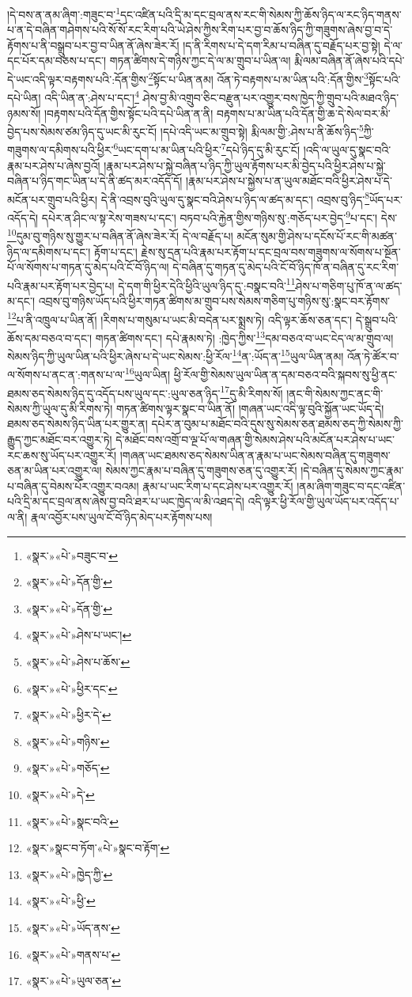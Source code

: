།དེ་བས་ན་ནམ་ཞིག་:གཟུང་བ་\footnote{«སྣར་»«པེ་»བཟུང་བ་}དང་འཛིན་པའི་དྲི་མ་དང་བྲལ་ནས་རང་གི་སེམས་ཀྱི་ཆོས་ཉིད་ལ་རང་ཉིད་གནས་པ་ན་དེ་བཞིན་གཤེགས་པའི་སོ་སོ་རང་རིག་པའི་ཡེ་ཤེས་ཀྱིས་རིག་པར་བྱ་བ་ཆོས་ཉིད་ཀྱི་གཟུགས་ཞེས་བྱ་བ་དེ་རྟོགས་པ་ནི་བསྒྲུབ་པར་བྱ་བ་ཡིན་ནོ་ཞེས་ཟེར་རོ། །ད་ནི་རིགས་པ་དེ་དག་རིམ་པ་བཞིན་དུ་བརྗོད་པར་བྱ་སྟེ། དེ་ལ་དང་པོར་དམ་བཅས་པ་དང་། གཏན་ཚིགས་དེ་གཉིས་ཀྱང་དེ་ལ་མ་གྲུབ་པ་ཡིན་ལ། རྨི་ལམ་བཞིན་ནོ་ཞེས་པའི་དཔེ་དེ་ཡང་འདི་ལྟར་བརྟགས་པའི་:དོན་གྱིས་\footnote{«སྣར་»«པེ་»དོན་གྱི་}སྟོང་པ་ཡིན་ནམ། འོན་ཏེ་བརྟགས་པ་མ་ཡིན་པའི་:དོན་གྱིས་\footnote{«སྣར་»«པེ་»དོན་གྱི་}སྟོང་པའི་དཔེ་ཡིན། འདི་ཡིན་ན་:ཤེས་པ་དང་།\footnote{«སྣར་»«པེ་»ཤེས་པ་ཡང་།} ཤེས་བྱ་མི་འགྲུབ་ཅིང་བརྫུན་པར་འགྱུར་བས་ཁྱེད་ཀྱི་གྲུབ་པའི་མཐའ་ཉིད་ཉམས་སོ། །བརྟགས་པའི་དོན་གྱིས་སྟོང་པའི་དཔེ་ཡིན་ན་ནི། བརྟགས་པ་མ་ཡིན་པའི་དོན་གྱི་ཆ་དེ་སེལ་བར་མི་བྱེད་པས་སེམས་ཙམ་ཉིད་དུ་ཡང་མི་རུང་ངོ། །དཔེ་འདི་ཡང་མ་གྲུབ་སྟེ། རྨི་ལམ་གྱི་:ཤེས་པ་ནི་ཆོས་ཉིད་\footnote{«སྣར་»«པེ་»ཤེས་པ་ཆོས་}ཀྱི་གཟུགས་ལ་དམིགས་པའི་ཕྱིར་\footnote{«སྣར་»«པེ་»ཕྱིར་དང་}ཡང་དག་པ་མ་ཡིན་པའི་ཕྱིར་\footnote{«སྣར་»«པེ་»ཕྱིར་དེ་}དཔེ་ཉིད་དུ་མི་རུང་ངོ། །འདི་ལ་ཡུལ་དུ་སྣང་བའི་རྣམ་པར་ཤེས་པ་ཞེས་བྱའོ། །རྣམ་པར་ཤེས་པ་སྐྱེ་བཞིན་པ་ཉིད་ཀྱི་ཡུལ་རྟོགས་པར་མི་བྱེད་པའི་ཕྱིར་ཤེས་པ་སྐྱེ་བཞིན་པ་ཉིད་གང་ཡིན་པ་དེ་ནི་ཚད་མར་འདོད་དོ། །རྣམ་པར་ཤེས་པ་སྐྱེས་པ་ན་ཡུལ་མཐོང་བའི་ཕྱིར་ཤེས་པ་དེ་མངོན་པར་གྲུབ་པའི་ཕྱིར། དེ་ནི་འབྲས་བུའི་ཡུལ་དུ་སྣང་བའི་ཤེས་པ་ཉིད་ལ་ཚད་མ་དང་། འབྲས་བུ་ཉིད་\footnote{«སྣར་»«པེ་»གཉིས་}ཡོད་པར་འདོད་དེ། དཔེར་ན་ཤིང་ལ་སྟ་རེས་གཟས་པ་དང་། བཏབ་པའི་རྐྱེན་གྱིས་གཉིས་སུ་:གཅོད་པར་བྱེད་\footnote{«སྣར་»«པེ་»གཅོད་}པ་དང་། དེས་\footnote{«སྣར་»«པེ་»དེ་}དུམ་བུ་གཉིས་སུ་གྱུར་པ་བཞིན་ནོ་ཞེས་ཟེར་རོ། དེ་ལ་བརྗོད་པ། མངོན་སུམ་གྱི་ཤེས་པ་དངོས་པོ་རང་གི་མཚན་ཉིད་ལ་དམིགས་པ་དང་། རྟོག་པ་དང་། རྗེས་སུ་དྲན་པའི་རྣམ་པར་རྟོག་པ་དང་བྲལ་བས་གཟུགས་ལ་སོགས་པ་སྔོན་པོ་ལ་སོགས་པ་གཏན་དུ་མེད་པའི་ངོ་བོ་ཉིད་ལ། དེ་བཞིན་དུ་གཏན་དུ་མེད་པའི་ངོ་བོ་ཉིད་ཁོ་ན་བཞིན་དུ་རང་རིག་པའི་རྣམ་པར་རྟོག་པར་བྱེད་པ། དེ་དག་གི་ཕྱིར་དེའི་ཕྱིའི་ཡུལ་ཉིད་དུ་:བསྣང་བའི་\footnote{«སྣར་»«པེ་»སྣང་བའི་}ཤེས་པ་གཅིག་པུ་ཁོ་ན་ལ་ཚད་མ་དང་། འབྲས་བུ་གཉིས་ཡོད་པའི་ཕྱིར་གཏན་ཚིགས་མ་གྲུབ་པས་སེམས་གཅིག་པུ་གཉིས་སུ་:སྣང་བར་རྟོགས་\footnote{«སྣར་»སྣང་བ་ཏོག་«པེ་»སྣང་བ་རྟོག་}པ་ནི་འཁྲུལ་པ་ཡིན་ནོ། །རིགས་པ་གསུམ་པ་ཡང་མི་བདེན་པར་སྨྲས་ཏེ། འདི་ལྟར་ཆོས་ཅན་དང་། དེ་སྒྲུབ་པའི་ཆོས་དམ་བཅའ་བ་དང་། གཏན་ཚིགས་དང་། དཔེ་རྣམས་ཏེ། :ཁྱེད་ཀྱིས་\footnote{«སྣར་»«པེ་»ཁྱེད་ཀྱི་}དམ་བཅའ་བ་ཡང་ངེད་ལ་མ་གྲུབ་ལ། སེམས་ཉིད་ཀྱི་ཡུལ་ཡིན་པའི་ཕྱིར་ཞེས་པ་དེ་ཡང་སེམས་:ཕྱི་རོལ་\footnote{«སྣར་»«པེ་»ཕྱི་}ན་:ཡོད་ན་\footnote{«སྣར་»«པེ་»ཡོད་ནས་}ཡུལ་ཡིན་ནམ། འོན་ཏེ་ཚོར་བ་ལ་སོགས་པ་ནང་ན་:གནས་པ་ལ་\footnote{«སྣར་»«པེ་»གནས་པ་}ཡུལ་ཡིན། ཕྱི་རོལ་གྱི་སེམས་ཡུལ་ཡིན་ན་དམ་བཅའ་བའི་སྐབས་སུ་ཕྱི་ནང་ཐམས་ཅད་སེམས་ཉིད་དུ་འདོད་པས་ཡུལ་དང་:ཡུལ་ཅན་ཉིད་\footnote{«སྣར་»«པེ་»ཡུལ་ཅན་}དུ་མི་རིགས་སོ། །ནང་གི་སེམས་ཀྱང་ནང་གི་སེམས་ཀྱི་ཡུལ་དུ་མི་རིགས་ཏེ། གཏན་ཚིགས་ལྟར་སྣང་བ་ཡིན་ནོ། །གཞན་ཡང་འདི་ལྟ་བུའི་སྐྱོན་ཡང་ཡོད་དེ། ཐམས་ཅད་སེམས་ཉིད་ཡིན་པར་གྱུར་ན། དཔེར་ན་བུམ་པ་མཐོང་བའི་དུས་སུ་སེམས་ཅན་ཐམས་ཅད་ཀྱི་སེམས་ཀྱི་རྒྱུད་ཀྱང་མཐོང་བར་འགྱུར་ཏེ། དེ་མཐོང་བས་འགྲོ་བ་ལྔ་པོ་ལ་གཞན་གྱི་སེམས་ཤེས་པའི་མངོན་པར་ཤེས་པ་ཡང་རང་ཆས་སུ་ཡོད་པར་འགྱུར་རོ། །གཞན་ཡང་ཐམས་ཅད་སེམས་ཡིན་ན་རྣམ་པ་ཡང་སེམས་བཞིན་དུ་གཟུགས་ཅན་མ་ཡིན་པར་འགྱུར་ལ། སེམས་ཀྱང་རྣམ་པ་བཞིན་དུ་གཟུགས་ཅན་དུ་འགྱུར་རོ། །དེ་བཞིན་དུ་སེམས་ཀྱང་རྣམ་པ་བཞིན་དུ་བེམས་པོར་འགྱུར་བའམ། རྣམ་པ་ཡང་རིག་པ་དང་ཤེས་པར་འགྱུར་རོ། །ནམ་ཞིག་གཟུང་བ་དང་འཛིན་པའི་དྲི་མ་དང་བྲལ་ནས་ཞེས་བྱ་བའི་ཐར་པ་ཡང་ཁྱེད་ལ་མི་འཐད་དེ། འདི་ལྟར་ཕྱི་རོལ་གྱི་ཡུལ་ཡོད་པར་འདོད་པ་ལ་ནི། རྣལ་འབྱོར་པས་ཡུལ་ངོ་བོ་ཉིད་མེད་པར་རྟོགས་པས། 